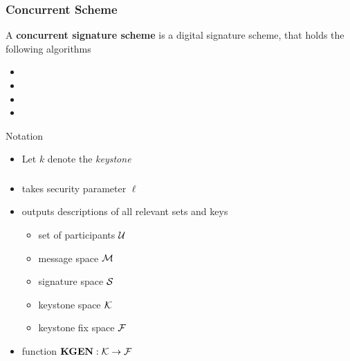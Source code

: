 \begin{frame}
	\frametitle{Concurrent Scheme}

	\begin{definition}
		A \textbf{concurrent signature scheme} is a digital signature scheme, that holds the following algorithms
		\begin{itemize}
			\item \setup
			\item \asign
			\item \averify
			\item \verify
		\end{itemize}
	\end{definition}

	\begin{block}{Notation}
		\begin{itemize}
			\item Let $k$ denote the \textit{keystone}
		\end{itemize}
	\end{block}
\end{frame}

\begin{frame}
	\frametitle{\setup}

	\begin{itemize}
		\item takes security parameter $\ell$
		\item outputs descriptions of all relevant sets and keys
			\begin{itemize}
				\item set of participants $\mathcal{U}$
				\item message space $\mathcal{M}$
				\item signature space $\mathcal{S}$
				\item keystone space $\mathcal{K}$
				\item keystone fix space $\mathcal{F}$
			\end{itemize}
		\item function $\textbf{KGEN}: \mathcal{K} \to \mathcal{F}$
	\end{itemize}
\end{frame}

